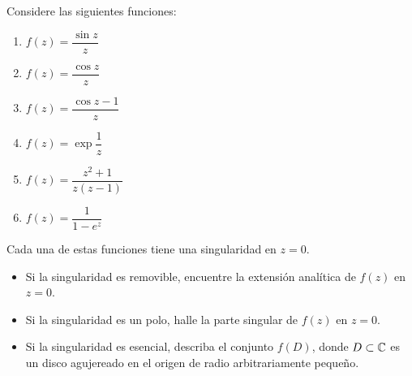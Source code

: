 \begin{exercise}
Considere las siguientes funciones:
\begin{enumerate}[label=(\alph*)]
    \item $f(z) = \dfrac {\sin z} z$
    \item $f(z) = \dfrac {\cos z} z$
    \item $f(z) = \dfrac {\cos z - 1} z$
    \item $f(z) = \exp \dfrac 1z$
    \item $f(z) = \dfrac {z^2 + 1} {z (z - 1)}$
    \item $f(z) = \dfrac 1 {1 - e^z}$
\end{enumerate}
Cada una de estas funciones tiene una singularidad en $z = 0$.
\begin{itemize}
    \item Si la singularidad es removible, encuentre la extensión analítica de $f(z)$ en $z = 0$.
    \item Si la singularidad es un polo, halle la parte singular de $f(z)$ en $z = 0$.
    \item Si la singularidad es esencial, describa el conjunto $f(D)$, donde $D \subset \mathbb C$ es un disco agujereado en el origen de radio arbitrariamente pequeño.
\end{itemize}
\end{exercise}

